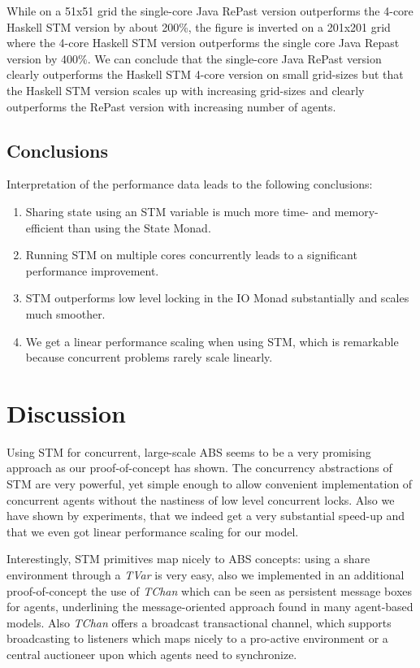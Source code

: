 While on a 51x51 grid the single-core Java RePast version outperforms the 4-core Haskell STM version by about 200\%, the figure is inverted on a 201x201 grid where the 4-core Haskell STM version outperforms the single core Java Repast version by 400\%. We can conclude that the single-core Java RePast version clearly outperforms the Haskell STM 4-core version on small grid-sizes but that the Haskell STM version scales up with increasing grid-sizes and clearly outperforms the RePast version with increasing number of agents.

\subsection{Conclusions}
Interpretation of the performance data leads to the following conclusions:
\begin{enumerate}
	\item Sharing state using an STM variable is much more time- and memory-efficient than using the State Monad.
	\item Running STM on multiple cores concurrently leads to a significant performance improvement.
	\item STM outperforms low level locking in the IO Monad substantially and scales much smoother.
	\item We get a linear performance scaling when using STM, which is remarkable because concurrent problems rarely scale linearly.
\end{enumerate}

\section{Discussion}
\label{sect:stm_discussion}
Using STM for concurrent, large-scale ABS seems to be a very promising approach as our proof-of-concept has shown. The concurrency abstractions of STM are very powerful, yet simple enough to allow convenient implementation of concurrent agents without the nastiness of low level concurrent locks. Also we have shown by experiments, that we indeed get a very substantial speed-up and that we even got linear performance scaling for our model. 

Interestingly, STM primitives map nicely to ABS concepts: using a share environment through a \textit{TVar} is very easy, also we implemented in an additional proof-of-concept the use of \textit{TChan} which can be seen as persistent message boxes for agents, underlining the message-oriented approach found in many agent-based models. Also \textit{TChan} offers a broadcast transactional channel, which supports broadcasting to listeners which maps nicely to a pro-active environment or a central auctioneer upon which agents need to synchronize.

